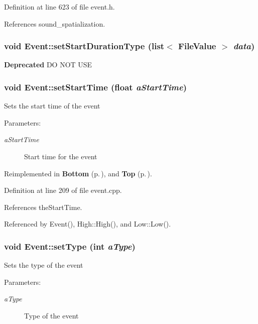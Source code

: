 Definition at line 623 of file event.h.

References sound\_\-spatialization.
\subsubsection{\setlength{\rightskip}{0pt plus 5cm}void Event::set\-Start\-Duration\-Type (list$<$ {\bf File\-Value} $>$ {\em data})}\label{classEvent_a47}


\begin{Desc}
\item[{\bf Deprecated}]DO NOT USE \end{Desc}
\subsubsection{\setlength{\rightskip}{0pt plus 5cm}void Event::set\-Start\-Time (float {\em a\-Start\-Time})\hspace{0.3cm}{\tt  [virtual]}}\label{classEvent_a7}


Sets the start time of the event \begin{Desc}
\item[Parameters:]
\begin{description}
\item[{\em a\-Start\-Time}]Start time for the event \end{description}
\end{Desc}


Reimplemented in {\bf Bottom} {\rm (p.\,\pageref{classBottom_a7})}, and {\bf Top} {\rm (p.\,\pageref{classTop_a5})}.

Definition at line 209 of file event.cpp.

References the\-Start\-Time.

Referenced by Event(), High::High(), and Low::Low().
\subsubsection{\setlength{\rightskip}{0pt plus 5cm}void Event::set\-Type (int {\em a\-Type})\hspace{0.3cm}{\tt  [virtual]}}\label{classEvent_a9}


Sets the type of the event \begin{Desc}
\item[Parameters:]
\begin{description}
\item[{\em a\-Type}]Type of the event \end{description}
\end{Desc}


